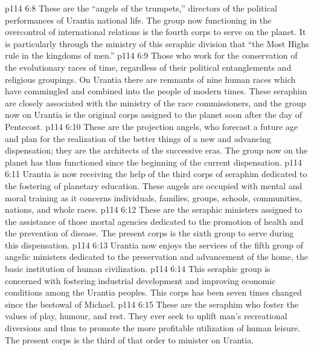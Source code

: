 \vs p114 6:8 \bibnobreakspace {} These are the “angels of the trumpets,” directors of the political performances of Urantia national life. The group now functioning in the overcontrol of international relations is the fourth corps to serve on the planet. It is particularly through the ministry of this seraphic division that “the Most Highs rule in the kingdoms of men.”
\vs p114 6:9 \bibnobreakspace {} Those who work for the conservation of the evolutionary races of time, regardless of their political entanglements and religious groupings. On Urantia there are remnants of nine human races which have commingled and combined into the people of modern times. These seraphim are closely associated with the ministry of the race commissioners, and the group now on Urantia is the original corps assigned to the planet soon after the day of Pentecost.
\vs p114 6:10 \bibnobreakspace {} These are the projection angels, who forecast a future age and plan for the realization of the better things of a new and advancing dispensation; they are the architects of the successive eras. The group now on the planet has thus functioned since the beginning of the current dispensation.
\vs p114 6:11 \bibnobreakspace {} Urantia is now receiving the help of the third corps of seraphim dedicated to the fostering of planetary education. These angels are occupied with mental and moral training as it concerns individuals, families, groups, schools, communities, nations, and whole races.
\vs p114 6:12 \bibnobreakspace {} These are the seraphic ministers assigned to the assistance of those mortal agencies dedicated to the promotion of health and the prevention of disease. The present corps is the sixth group to serve during this dispensation.
\vs p114 6:13 \bibnobreakspace {} Urantia now enjoys the services of the fifth group of angelic ministers dedicated to the preservation and advancement of the home, the basic institution of human civilization.
\vs p114 6:14 \bibnobreakspace {} This seraphic group is concerned with fostering industrial development and improving economic conditions among the Urantia peoples. This corps has been seven times changed since the bestowal of Michael.
\vs p114 6:15 \bibnobreakspace {} These are the seraphim who foster the values of play, humour, and rest. They ever seek to uplift man’s recreational diversions and thus to promote the more profitable utilization of human leisure. The present corps is the third of that order to minister on Urantia.

